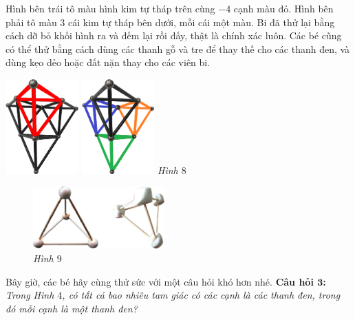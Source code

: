 	\begin{multicols}{2}
		Hình bên trái tô màu hình kim tự tháp trên cùng $- 4$ cạnh màu đỏ. Hình bên phải tô màu $3$ cái kim tự tháp bên dưới, mỗi cái một màu.
		\vskip 0.1cm
		Bi đã thử lại bằng cách dỡ bỏ khối hình ra và đếm lại rồi đấy, thật là chính xác luôn. Các bé cũng có thể thử bằng cách dùng các thanh gỗ và tre để thay thế cho các thanh đen, và dùng kẹo dẻo hoặc đất nặn thay cho các viên bi.
		\begin{center}
			\centering
			\vspace*{-10pt}
			\captionsetup{labelformat= empty, justification=centering} \includegraphics[width=0.21\textwidth]{8}\quad
			\includegraphics[width=0.21\textwidth]{8a}
			\textit{\small Hình $8$}
		\end{center}
	\begin{figure}[H]
		\centering
		\vspace*{-10pt}
		\captionsetup{labelformat= empty, justification=centering} \includegraphics[width=0.45\textwidth]{9}
		\caption{\small\textit{Hình $9$}}
		\vspace*{-10pt}
	\end{figure}
	\end{multicols}
	\vspace*{-5pt}
	Bây giờ, các bé hãy cùng thử sức với một câu hỏi khó hơn nhé.
	\vskip 0.1cm
	\textbf{Câu hỏi $\pmb{3}$:} \textit{Trong Hình $4$, có tất cả bao nhiêu tam giác có các cạnh là các thanh đen, trong đó mỗi cạnh là một thanh đen?}
